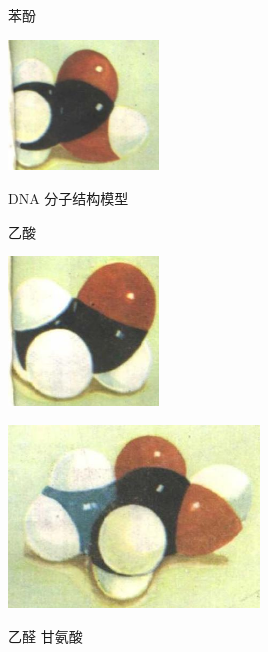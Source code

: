 \documentclass[10pt]{article}
\begin{document}
苯酚

\begin{center}
\includegraphics[max width=0.3\textwidth]{images/01912d16-be99-77bb-9535-4f3ed8d9946f_4_150277.jpg}
\end{center}

DNA 分子结构模型

乙酸

\begin{center}
\includegraphics[max width=0.3\textwidth]{images/01912d16-be99-77bb-9535-4f3ed8d9946f_4_492703.jpg}
\end{center}

\begin{center}
\includegraphics[max width=0.5\textwidth]{images/01912d16-be99-77bb-9535-4f3ed8d9946f_4_381697.jpg}
\end{center}

乙醛 甘氨酸
\end{document}
